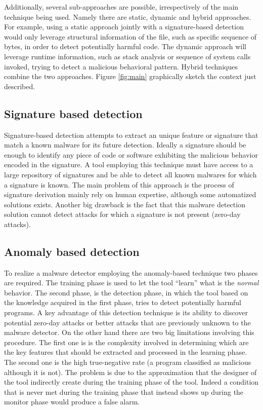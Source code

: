 \documentclass{article}
\begin{document}
Additionally, several sub-approaches are possible, irrespectively of the main technique being used. Namely there are static, dynamic and hybrid approaches. For example, using a static approach jointly with a signature-based detection would only leverage structural information of the file, such as specific sequence of bytes, in order to detect potentially harmful code. The dynamic approach will leverage runtime information, such as stack analysis or sequence of system calls invoked, trying to detect a malicious behavioral pattern. Hybrid techniques combine the two approaches. Figure \ref{fig:main} graphically sketch the context just described.

\subsection{Signature based detection} %
\label{sub:signature_based_detection}

Signature-based detection attempts to extract an unique feature or signature that match a known malware for its future detection. Ideally a signature should be enough to identify any piece of code or software exhibiting the malicious behavior encoded in the signature. A tool employing this technique must have access to a large repository of signatures and be able to detect all known malwares for which a signature is known. The main problem of this approach is the process of signature derivation mainly rely on human expertise, although some automatized solutions exists. Another big drawback is the fact that this malware detection solution cannot detect attacks for which a signature is not present (zero-day attacks).


\subsection{Anomaly based detection} %
\label{sub:anomaly_based_detection}

To realize a malware detector employing the anomaly-based technique two phases are required. The training phase is used to let the tool ``learn'' what is the \emph{normal} behavior. The second phase, is the detection phase, in which the tool based on the knowledge acquired in the first phase, tries to detect potentially harmful programs. A key advantage of this detection technique is its ability to discover potential zero-day attacks or better attacks that are previously unknown to the malware detector. On the other hand there are two big limitations involving this procedure. The first one is is the complexity involved in determining which are the key features that should be extracted and processed in the learning phase. The second one is the high true-negative rate (a program classified as malicious although it is not). The problem is due to the approximation that the designer of the tool indirectly create during the training phase of the tool. Indeed a condition that is never met during the training phase that instead shows up during the monitor phase would produce a false alarm.
\end{document}
